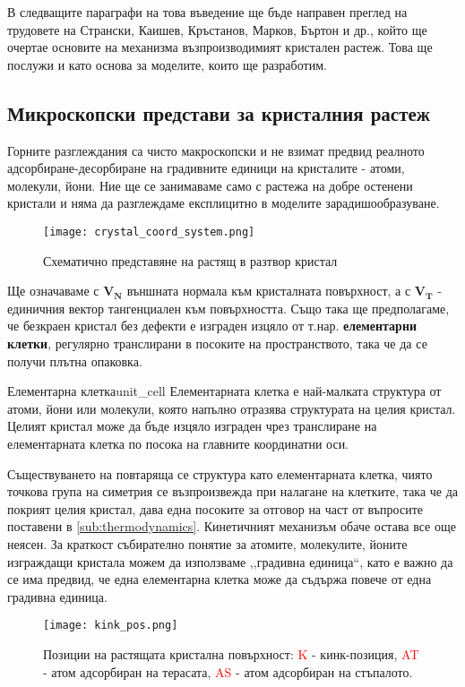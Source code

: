В следващите параграфи на това въведение ще бъде направен преглед на трудовете на Странски, Каишев, Кръстанов, Марков, Бъртон и др., който ще очертае основите на механизма възпроизводимият кристален растеж. Това ще послужи и като основа за моделите, които ще разработим.

\subsection{Микроскопски представи за кристалния растеж}
\label{sub:microscopic_growth}
Горните разглеждания са чисто макроскопски и не взимат предвид реалното ад\-сор\-би\-ра\-не-де\-сор\-би\-ра\-не на градивните единици на кристалите - атоми, молекули, йони. Ние ще се занимаваме само с растежа на добре остенени кристали и няма да разглеждаме експлицитно в моделите зарадишообразуване.
\begin{figure}[htbp]
	\centering
	\texttt{[image: crystal\_coord\_system.png]}
	\caption{Схематично представяне на растящ в разтвор кристал}
\end{figure}

Ще означаваме с $\boldsymbol{V_{N}}$ външната нормала към кристалната повърхност, а с $\boldsymbol{V_{T}}$ - единичния вектор тангенциален към повърхността. Също така ще предполагаме, че безкраен кристал без дефекти е изграден изцяло от т.нар. \textbf{елементарни клетки}, регулярно транслирани в посоките на пространството, така че да се получи плътна опаковка.

\begin{definition}{Елементарна клетка}{unit_cell}
    Елементарната клетка е най-малката структура от атоми, йони или молекули, която напълно отразява структурата на целия кристал. Целият кристал може да бъде изцяло изграден чрез транслиране на елементарната клетка по посока на главните координатни оси.
\end{definition}

Съществуването на повтаряща се структура като елементарната клетка, чиято точкова група на симетрия се възпроизвежда при налагане на клетките, така че да покрият целия кристал, дава една посоките за отговор на част от въпросите поставени в \autoref{sub:thermodynamics}. Кинетичният механизъм обаче остава все още неясен. За краткост събирателно понятие за атомите, молекулите, йоните изграждащи кристала можем да използваме ,,градивна единица``, като е важно да се има предвид, че една елементарна клетка може да съдържа повече от една градивна единица.

\begin{figure}[ht]
	\centering
	\texttt{[image: kink\_pos.png]}
	\caption{Позиции на растящата кристална повърхност:  \textcolor{red}{K} - кинк-позиция, \textcolor{red}{AT} - атом адсорбиран на терасата, \textcolor{red}{AS} - атом адсорбиран на стъпалото. }
	\label{fig:atoms_on_surface}
\end{figure}

